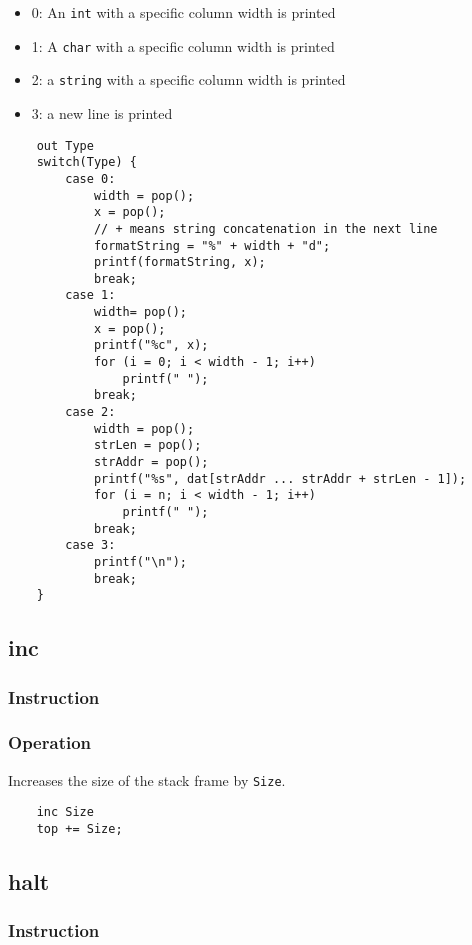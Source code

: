 \begin{itemize}
	\item 0: An \lstinline$int$ with a specific column width is printed
	\item 1: A \lstinline$char$ with a specific column width is printed
	\item 2: a \lstinline$string$ with a specific column width is printed
	\item 3: a new line is printed
\end{itemize}

	\begin{lstlisting}
	out Type
	switch(Type) {
		case 0:
			width = pop();
			x = pop();
			// + means string concatenation in the next line
			formatString = "%" + width + "d";
			printf(formatString, x);
			break;
		case 1:
			width= pop();
			x = pop();
			printf("%c", x);
			for (i = 0; i < width - 1; i++)
				printf(" ");
			break;
		case 2:
			width = pop();
			strLen = pop();
			strAddr = pop();
			printf("%s", dat[strAddr ... strAddr + strLen - 1]);
			for (i = n; i < width - 1; i++)
				printf(" ");
			break;
		case 3:
			printf("\n");
			break;
	}
	\end{lstlisting}

\subsection{inc}
\subsubsection{Instruction}

\subsubsection{Operation}
Increases the size of the stack frame by \lstinline$Size$.

	\begin{lstlisting}
	inc Size
	top += Size;
	\end{lstlisting}

\subsection{halt}
\subsubsection{Instruction}


